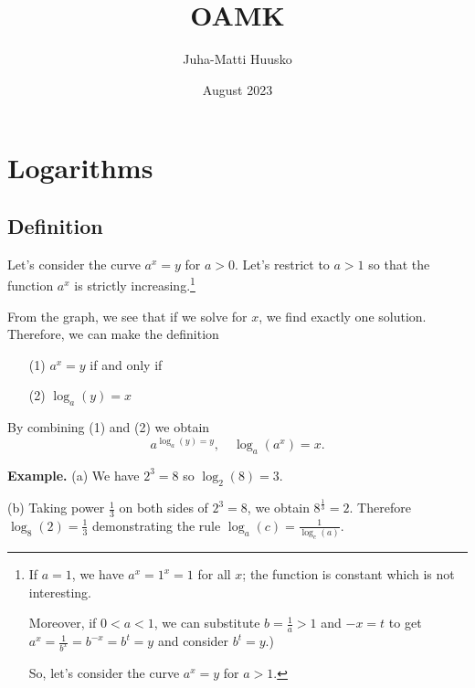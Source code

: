 \documentclass[12pt]{article}
\title{OAMK}
\author{Juha-Matti Huusko}
\date{August 2023}
\newcommand{\lt}[0]{<}
\newcommand{\gt}[0]{>}
\begin{document}
\thispagestyle{empty}

\section*{Logarithms}

\subsection*{Definition}
Let's consider the curve \(a^x=y\) for \(a\gt 0\). Let's restrict to \(a\gt 1\) so that the function \(a^x\) is strictly increasing.\footnote{If \(a=1\), we have \(a^x=1^x=1\) for all \(x\); the function is constant which is not interesting.

Moreover, if \(0\lt a\lt 1\), we can substitute \(b=\frac{1}{a}\gt 1\) and \(-x=t\) to get \(a^x=\frac{1}{b^x}=b^{-x}=b^t=y\) and consider \(b^t=y\).)

So, let's consider the curve \(a^x=y\) for \(a\gt 1\).}

From the graph, we see that if we solve for \(x\), we find exactly one solution. Therefore, we can make the definition
\begin{enumerate}
    \item [(1)]\(a^x=y\) if and only if
    \item [(2)]\(\log_a(y)=x\)
\end{enumerate}
By combining (1) and (2) we obtain
$$
a^{\log_a(y)=y},\quad \log_a(a^x)=x.
$$

\noindent\textbf{Example.} (a) We have \(2^3=8\) so \(\log_2(8)=3\).

\noindent (b) Taking power \(\frac{1}{3}\) on both sides of \(2^3=8\), we obtain \(8^{\frac{1}{3}}=2\). Therefore \(\log_8(2)=\frac{1}{3}\) demonstrating the rule \(\log_a(c)=\frac{1}{\log_c(a)}\).\\[2mm]
\end{document}
